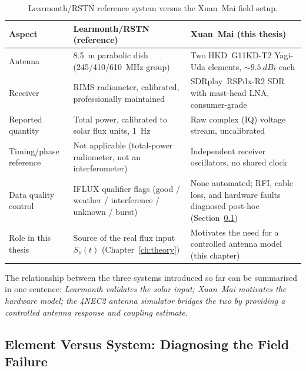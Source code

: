 \begin{table}[H]
  \centering
  \caption[Learmonth/RSTN reference system versus the Xuan~Mai field setup]{Learmonth/RSTN reference system versus the Xuan~Mai field setup.}
  \label{tab:learmonth-vs-xuanmai}
  \renewcommand{\arraystretch}{1.3}
  \begin{tabularx}{\textwidth}{l >{\raggedright\arraybackslash}X >{\raggedright\arraybackslash}X}
    \toprule
    \textbf{Aspect} & \textbf{Learmonth/RSTN (reference)} & \textbf{Xuan~Mai (this thesis)} \\
    \midrule
    Antenna & \SI{8.5}{\metre} parabolic dish (245/410/\SI{610}{\mega\hertz} group) & Two HKD~G11KD-T2 Yagi-Uda elements, $\sim\!\SI{9.5}{dBi}$ each \\
    Receiver & RIMS radiometer, calibrated, professionally maintained & SDRplay~RSPdx-R2 SDR with mast-head LNA, consumer-grade \\
    Reported quantity & Total power, calibrated to solar flux units, \SI{1}{\hertz} & Raw complex (IQ) voltage stream, uncalibrated \\
    Timing/phase reference & Not applicable (total-power radiometer, not an interferometer) & Independent receiver oscillators, no shared clock \\
    Data quality control & IFLUX qualifier flags (good / weather / interference / unknown / burst) & None automated; RFI, cable loss, and hardware faults diagnosed post-hoc (Section~\ref{subsec:element-vs-system}) \\
    Role in this thesis & Source of the real flux input $S_\nu(t)$ (Chapter~\ref{ch:theory}) & Motivates the need for a controlled antenna model (this chapter) \\
    \bottomrule
  \end{tabularx}
\end{table}

The relationship between the three systems introduced so far can be summarised
in one sentence: \emph{Learmonth validates the solar input; Xuan~Mai motivates
the hardware model; the 4NEC2 antenna simulator bridges the two by providing a
controlled antenna response and coupling estimate.}

\subsection{Element Versus System: Diagnosing the Field Failure}
\label{subsec:element-vs-system}

